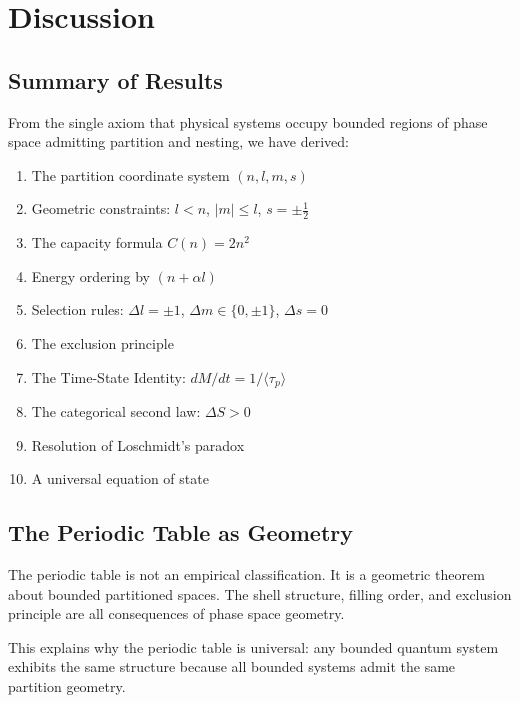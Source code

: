 \documentclass[twocolumn,10pt,a4paper]{article}
\theoremstyle{definition}
\theoremstyle{remark}
\begin{document}
\section{Discussion}
\label{sec:discussion}

\subsection{Summary of Results}

From the single axiom that physical systems occupy bounded regions of phase space admitting partition and nesting, we have derived:

\begin{enumerate}
    \item The partition coordinate system $(n, l, m, s)$
    \item Geometric constraints: $l < n$, $|m| \leq l$, $s = \pm\frac{1}{2}$
    \item The capacity formula $C(n) = 2n^2$
    \item Energy ordering by $(n + \alpha l)$
    \item Selection rules: $\Delta l = \pm 1$, $\Delta m \in \{0, \pm 1\}$, $\Delta s = 0$
    \item The exclusion principle
    \item The Time-State Identity: $dM/dt = 1/\langle\tau_p\rangle$
    \item The categorical second law: $\Delta S > 0$
    \item Resolution of Loschmidt's paradox
    \item A universal equation of state
\end{enumerate}

\subsection{The Periodic Table as Geometry}

The periodic table is not an empirical classification. It is a geometric theorem about bounded partitioned spaces. The shell structure, filling order, and exclusion principle are all consequences of phase space geometry.

This explains why the periodic table is universal: any bounded quantum system exhibits the same structure because all bounded systems admit the same partition geometry.
\end{document}
